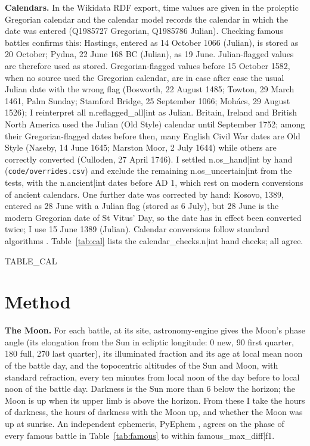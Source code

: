 \documentclass[11pt,a4paper]{article}
\begin{document}
\textbf{Calendars.} In the Wikidata RDF export, time values are given in the proleptic Gregorian calendar and the calendar model records the calendar in which the date was entered (Q1985727 Gregorian, Q1985786 Julian). Checking famous battles confirms this: Hastings, entered as 14 October 1066 (Julian), is stored as 20 October; Pydna, 22 June 168 BC (Julian), as 19 June. Julian-flagged values are therefore used as stored. Gregorian-flagged values before 15 October 1582, when no source used the Gregorian calendar, are in case after case the usual Julian date with the wrong flag (Bosworth, 22 August 1485; Towton, 29 March 1461, Palm Sunday; Stamford Bridge, 25 September 1066; Mohács, 29 August 1526); I reinterpret all {{n.reflagged_all|int}} as Julian. Britain, Ireland and British North America used the Julian (Old Style) calendar until September 1752; among their Gregorian-flagged dates before then, many English Civil War dates are Old Style (Naseby, 14 June 1645; Marston Moor, 2 July 1644) while others are correctly converted (Culloden, 27 April 1746). I settled {{n.os_hand|int}} by hand (\texttt{code/overrides.csv}) and exclude the remaining {{n.os_uncertain|int}} from the tests, with the {{n.ancient|int}} dates before AD 1, which rest on modern conversions of ancient calendars. One further date was corrected by hand: Kosovo, 1389, entered as 28 June with a Julian flag (stored as 6 July), but 28 June is the modern Gregorian date of St Vitus' Day, so the date has in effect been converted twice; I use 15 June 1389 (Julian). Calendar conversions follow standard algorithms \citep{reingold}. Table~\ref{tab:cal} lists the {{calendar_checks.n|int}} hand checks; all agree.

{{TABLE_CAL}}

\section{Method}
\textbf{The Moon.} For each battle, at its site, astronomy-engine \citep{astronomyengine} gives the Moon's phase angle (its elongation from the Sun in ecliptic longitude: 0\textdegree{} new, 90\textdegree{} first quarter, 180\textdegree{} full, 270\textdegree{} last quarter), its illuminated fraction and its age at local mean noon of the battle day, and the topocentric altitudes of the Sun and Moon, with standard refraction, every ten minutes from local noon of the day before to local noon of the battle day. Darkness is the Sun more than 6\textdegree{} below the horizon; the Moon is up when its upper limb is above the horizon. From these I take the hours of darkness, the hours of darkness with the Moon up, and whether the Moon was up at sunrise. An independent ephemeris, PyEphem \citep{pyephem}, agrees on the phase of every famous battle in Table~\ref{tab:famous} to within {{famous_max_diff|f1}}\textdegree.
\end{document}

